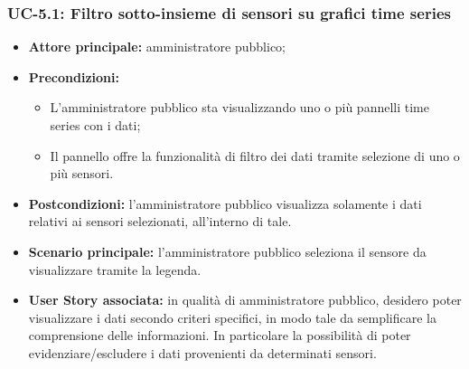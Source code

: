 \documentclass[8pt]{article}
\begin{document}
\subsubsection*{UC-5.1: Filtro sotto-insieme di sensori su grafici time series}
\begin{itemize}
    \item \textbf{Attore principale:} amministratore pubblico;
    \item \textbf{Precondizioni:}
    \begin{itemize}
        \item L’amministratore pubblico sta visualizzando uno o più pannelli time series con i dati;
        \item Il pannello offre la funzionalità di filtro dei dati tramite selezione di uno o più sensori.
    \end{itemize}
    \item \textbf{Postcondizioni:} l’amministratore pubblico visualizza solamente i dati relativi ai sensori
selezionati, all’interno di tale.
    \item \textbf{Scenario principale: }l’amministratore pubblico seleziona il sensore da
        visualizzare tramite la legenda.
    \item \textbf{User Story associata:} in qualità di amministratore pubblico, desidero poter
        visualizzare i dati secondo criteri specifici, in modo tale da semplificare la comprensione
        delle informazioni. In particolare la possibilità di poter evidenziare/escludere i dati
        provenienti da determinati sensori.
\end{itemize}
\end{document}
